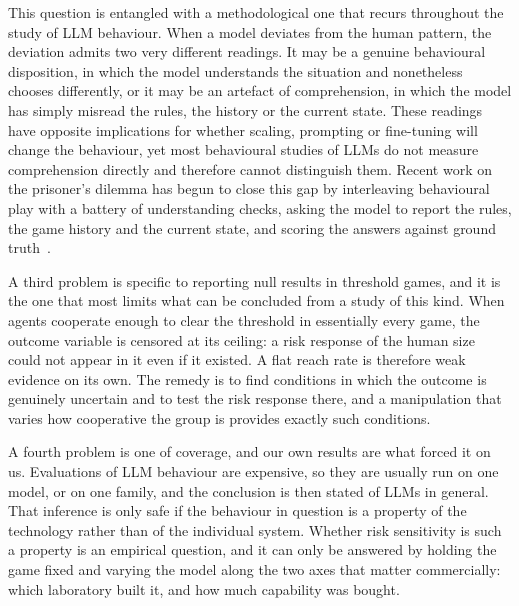 \documentclass[openacc]{rsproca_new}
\begin{document}
This question is entangled with a methodological one that recurs throughout the study of LLM behaviour. When a model deviates from the human pattern, the deviation admits two very different readings. It may be a genuine behavioural disposition, in which the model understands the situation and nonetheless chooses differently, or it may be an artefact of comprehension, in which the model has simply misread the rules, the history or the current state. These readings have opposite implications for whether scaling, prompting or fine-tuning will change the behaviour, yet most behavioural studies of LLMs do not measure comprehension directly and therefore cannot distinguish them. Recent work on the prisoner's dilemma has begun to close this gap by interleaving behavioural play with a battery of understanding checks, asking the model to report the rules, the game history and the current state, and scoring the answers against ground truth~\cite{fontana2024nicer}.

A third problem is specific to reporting null results in threshold games, and it is the one that most limits what can be concluded from a study of this kind. When agents cooperate enough to clear the threshold in essentially every game, the outcome variable is censored at its ceiling: a risk response of the human size could not appear in it even if it existed. A flat reach rate is therefore weak evidence on its own. The remedy is to find conditions in which the outcome is genuinely uncertain and to test the risk response there, and a manipulation that varies how cooperative the group is provides exactly such conditions.

A fourth problem is one of coverage, and our own results are what forced it on us. Evaluations of LLM behaviour are expensive, so they are usually run on one model, or on one family, and the conclusion is then stated of LLMs in general. That inference is only safe if the behaviour in question is a property of the technology rather than of the individual system. Whether risk sensitivity is such a property is an empirical question, and it can only be answered by holding the game fixed and varying the model along the two axes that matter commercially: which laboratory built it, and how much capability was bought.
\end{document}

